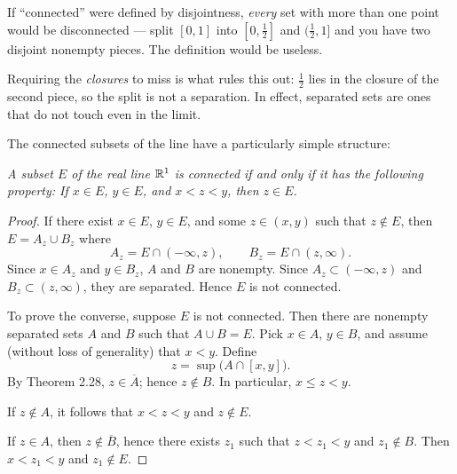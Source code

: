 \begin{pitfall}
If ``connected'' were defined by disjointness, \emph{every} set with more than
one point would be disconnected --- split $[0,1]$ into $[0,\frac12]$ and
$(\frac12,1]$ and you have two disjoint nonempty pieces. The definition would
be useless.

Requiring the \emph{closures} to miss is what rules this out: $\frac12$ lies in
the closure of the second piece, so the split is not a separation. In effect,
separated sets are ones that do not touch even in the limit.
\end{pitfall}

The connected subsets of the line have a particularly simple structure:

\emph{A subset $E$ of the real line $\mathbb{R}^1$ is connected if and only if it has
the following property: If $x \in E$, $y \in E$, and $x < z < y$, then
$z \in E$.}

\begin{proof}
If there exist $x \in E$, $y \in E$, and some $z \in (x,y)$ such that
$z \notin E$, then $E = A_z \cup B_z$ where
\[ A_z = E \cap (-\infty,z), \qquad B_z = E \cap (z,\infty). \]
Since $x \in A_z$ and $y \in B_z$, $A$ and $B$ are nonempty. Since
$A_z \subset (-\infty,z)$ and $B_z \subset (z,\infty)$, they are separated.
Hence $E$ is not connected.

To prove the converse, suppose $E$ is not connected. Then there are nonempty
separated sets $A$ and $B$ such that $A \cup B = E$. Pick $x \in A$,
$y \in B$, and assume (without loss of generality) that $x < y$. Define
\[ z = \sup\bigl(A \cap [x,y]\bigr). \]
By Theorem 2.28, $z \in \overline{A}$; hence $z \notin B$. In particular,
$x \le z < y$.

If $z \notin A$, it follows that $x < z < y$ and $z \notin E$.

If $z \in A$, then $z \notin \overline{B}$, hence there exists $z_1$ such that
$z < z_1 < y$ and $z_1 \notin B$. Then $x < z_1 < y$ and $z_1 \notin E$.
\end{proof}

